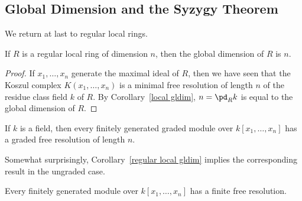 \subsection{Global Dimension and the Syzygy Theorem}
We return at last to regular local rings.
\begin{corollary}\label{regular local gldim}
If $R$ is a regular local ring of dimension $n$, then the global dimension of $R$ is $n$.
\end{corollary}
\begin{proof}
If $x_1,\dots,x_n$ generate the maximal ideal of $R$, then we have seen that the Koszul complex $K(x_1,\dots,x_n)$ is a minimal free resolution of length $n$ of the residue class field $k$ of $R$. By Corollary~\ref{local gldim}, $n=\pd_Rk$ is equal to the global dimension of $R$.
\end{proof}
\begin{corollary}
If $k$ is a field, then every finitely generated graded module over $k[x_1,\dots,x_n]$ has a graded free resolution of length $n$.
\end{corollary}
Somewhat surprisingly, Corollary~\ref{regular local gldim} implies the corresponding result in the ungraded case.
\begin{corollary}
Every finitely generated module over $k[x_1,\dots,x_n]$ has a finite free resolution.
\end{corollary}
